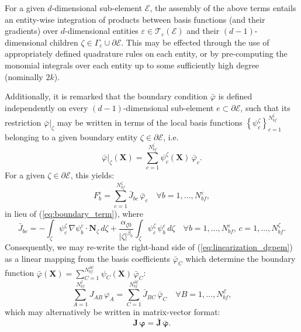 	For a given $d$-dimensional sub-element $\mathcal{E}$, the assembly of the above terms entails an entity-wise integration of products between basis functions (and their gradients) over $d$-dimensional entities $\varepsilon \in \mathcal{T}_\varepsilon (\mathcal{E})$ and their $(d-1)$-dimensional children $\zeta \in \Gamma_\varepsilon \cup \partial \mathcal{E}$. This may be effected through the use of appropriately defined quadrature rules on each entity, or by pre-computing the monomial integrals over each entity up to some sufficiently high degree (nominally $2k$).
	
	Additionally, it is remarked that the boundary condition $\bar{\varphi}$ is defined independently on every $(d-1)$-dimensional sub-element $e \subset \partial \mathcal{E}$, such that its restriction $\bar{\varphi}|_\zeta$ may be written in terms of the local basis functions $\left\{ \psi^{\zeta}_c \right\}_{c=1}^{N^\zeta_{bf}}$ belonging to a given boundary entity $\zeta \in \partial \mathcal{E}$, i.e.
	\begin{equation}
			\bar{\varphi}|_\zeta (\mathbf{X}) = \sum_{c=1}^{N^\zeta_{bf}} \psi^\zeta_c (\mathbf{X}) \, \bar{\varphi}_c.
	\end{equation}
	For a given $\zeta \in \partial \mathcal{E}$, this yields:
	\begin{equation}
		F^{\varepsilon}_b = \sum_{c=1}^{N^\zeta_{bf}} \bar{J}_{bc} \, \bar{\varphi}_c \quad \forall b = 1, \ldots, N^{\varepsilon}_{bf},
	\end{equation}
	in lieu of (\ref{eq:boundary_term}), where
	\begin{equation}
		\bar{J}_{bc} = - \int_{\zeta} \psi^\zeta_c \, \nabla \psi_b^{\varepsilon} \cdot \mathbf{N}_{\zeta} \, d \zeta + \frac{\alpha_{\zeta0}}{|\zeta|^{\beta_0}} \int_{\zeta} \psi^\zeta_c \, \psi_b^{\varepsilon} \, d \zeta \quad \forall b = 1, \ldots, N^{\varepsilon}_{bf}, \, c = 1, \ldots, N^\zeta_{bf}.
	\end{equation}
	Consequently, we may re-write the right-hand side of (\ref{eq:linearization_dgpem}) as a linear mapping from the basis coefficients $\bar{\varphi}_C$ which determine the boundary function $\bar{\varphi} (\mathbf{X}) = \sum_{C=1}^{N^{\partial \mathcal{E}}_{bf}} \psi_C (\mathbf{X}) \, \bar{\varphi}_C$:
	\begin{equation}
		\sum_{A=1}^{N^{\mathcal{E}}_{bf}} J_{AB} \, \varphi_A = \sum_{C=1}^{N^{\partial \mathcal{E}}_{bf}} \bar{J}_{BC} \, \bar{\varphi}_C \quad \forall B = 1, \ldots, N^{\mathcal{E}}_{bf},
	\end{equation}
	which may alternatively be written in matrix-vector format:
	\begin{equation}
		\mathbf{J} \, \boldsymbol{\varphi} = \bar{\mathbf{J}} \, \bar{\boldsymbol{\varphi}}.
	\end{equation}
	
